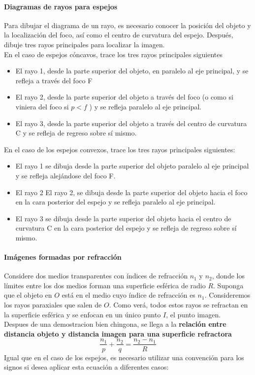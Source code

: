 \documentclass[10pt]{article}
\begin{document}
\paragraph{Diagramas de rayos para espejos}
Para dibujar el diagrama de un rayo, es necesario conocer la posición del objeto y la localización del foco, así como el centro de curvatura del espejo. Después, dibuje tres rayos principales para localizar la imagen.\\
En el caso de espejos cóncavos, trace los tres rayos principales siguientes
\begin{itemize}
	\item El rayo 1, desde la parte superior del objeto, en paralelo al eje principal, y se refleja a través del foco F
	\item El rayo 2, desde la parte superior del objeto a través del foco (o como si viniera del foco si $p < f$ ) y se refleja paralelo al eje principal.
	\item El rayo 3, desde la parte superior del objeto a través del centro de curvatura C y se refleja de regreso sobre sí mismo.
\end{itemize}
En el caso de los espejos convexos, trace los tres rayos principales siguientes:
\begin{itemize}
	\item El rayo 1 se dibuja desde la parte superior del objeto paralelo al eje principal y se refleja alejándose del foco F.
	\item El rayo 2 El rayo 2, se dibuja desde la parte superior del objeto hacia el foco en la cara posterior del espejo y se refleja paralelo al eje principal.
	\item El rayo 3 se dibuja desde la parte superior del objeto hacia el centro de curvatura C en la cara posterior del espejo y se refleja de regreso sobre sí mismo.
\end{itemize}
\paragraph{Imágenes formadas por refracción}
Considere dos medios transparentes con índices de refracción $n_1$ y $n_2$, donde los límites entre los dos medios forman una superficie esférica de radio $R$. Suponga que el objeto en $O$ está en el medio cuyo índice de refracción es $n_1$. Consideremos los rayos paraxiales que salen de $O$. Como verá, todos estos rayos se refractan en la superficie esférica y se enfocan en un único punto $I$, el punto imagen.\\
Despues de una demostracion bien chingona, se llega a la \textbf{relación entre distancia objeto y distancia imagen para una superficie refractora}
\begin{equation*}
	\dfrac{n_1}{p} + \dfrac{n_2}{q} = \dfrac{n_2-n_1}{R}
\end{equation*}
Igual que en el caso de los espejos, es necesario utilizar una convención para los signos si desea aplicar esta ecuación a diferentes casos:
\end{document}
